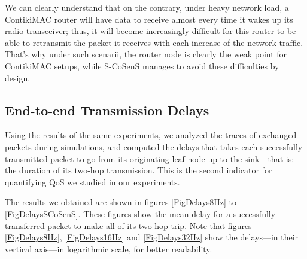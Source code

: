\documentclass[conference]{IEEEtran}
\begin{document}
We can clearly understand that on the contrary, under heavy network load,
a ContikiMAC router will have data to receive almost every time it wakes up
its radio transceiver; thus, it will become increasingly difficult for this
router to be able to retransmit the packet it receives with each increase
of the network traffic. That's why under such scenarii, the router node
is clearly the weak point for ContikiMAC setups, while S-CoSenS manages
to avoid these difficulties by design.



\subsection{End-to-end Transmission Delays}

Using the results of the same experiments, we analyzed the traces of
exchanged packets during simulations, and computed the delays that takes each
successfully transmitted packet to go from its originating leaf node up to
the sink---that is: the duration of its two-hop transmission.
This is the second indicator for quantifying QoS we studied
in our experiments.

The results we obtained are shown in figures \ref{FigDelays8Hz} to
\ref{FigDelaysSCoSenS}. These figures show the mean delay for
a successfully transferred packet to make all of its two-hop trip.
Note that figures \ref{FigDelays8Hz}, \ref{FigDelays16Hz} and
\ref{FigDelays32Hz} show the delays---in their vertical axis---in
logarithmic scale, for better readability.
\end{document}
